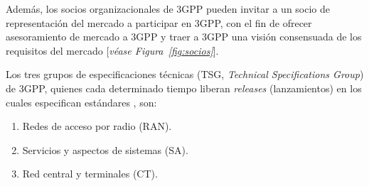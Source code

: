 Además, los socios organizacionales de 3GPP pueden invitar a un socio de representación del mercado a participar en 3GPP, con el fin de ofrecer asesoramiento de mercado a 3GPP y traer a 3GPP una visión consensuada de los requisitos del mercado [\textit{véase Figura~\ref{fig:socios}}].\newline

Los tres grupos de especificaciones técnicas (TSG, \textit{Technical Specifications Group}) de 3GPP,  quienes cada determinado tiempo liberan \textit{releases} (lanzamientos) en los cuales especifican estándares \parencite{3GPP2019}, son:

\begin{enumerate}
\item  Redes de acceso por radio (RAN).
\item  Servicios y aspectos de sistemas (SA).
\item  Red central y terminales (CT).
\end{enumerate}